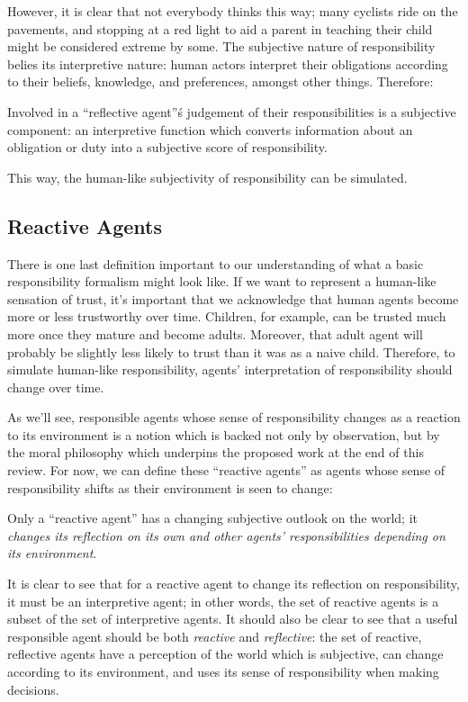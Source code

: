 However, it is clear that not everybody thinks this way; many cyclists ride on the pavements, and stopping at a red light to aid a parent in teaching their child might be considered extreme by some. The subjective nature of responsibility belies its interpretive nature: human actors interpret their obligations according to their beliefs, knowledge, and preferences, amongst other things. Therefore:
\begin{displayquote}
    Involved in a ``reflective agent''\'s judgement of their responsibilities is a subjective component: an interpretive function which converts information about an obligation or duty into a subjective score of responsibility.
\end{displayquote}\par

This way, the human-like subjectivity of responsibility can be simulated.

\subsection{Reactive Agents}
There is one last definition important to our understanding of what a basic responsibility formalism might look like. If we want to represent a human-like sensation of trust, it's important that we acknowledge that human agents become more or less trustworthy over time. Children, for example, can be trusted much more once they mature and become adults. Moreover, that adult agent will probably be slightly less likely to trust than it was as a naive child. Therefore, to simulate human-like responsibility, agents' interpretation of responsibility should change over time.\par

As we'll see, responsible agents whose sense of responsibility changes as a reaction to its environment is a notion which is backed not only by observation, but by the moral philosophy which underpins the proposed work at the end of this review. For now, we can define these ``reactive agents'' as agents whose sense of responsibility shifts as their environment is seen to change:
\begin{displayquote}
    Only a ``reactive agent'' has a changing subjective outlook on the world; it \emph{changes its reflection on its own and other agents' responsibilities depending on its environment}.
\end{displayquote}\par

It is clear to see that for a reactive agent to change its reflection on responsibility, it must be an interpretive agent; in other words, the set of reactive agents is a subset of the set of interpretive agents. It should also be clear to see that a useful responsible agent should be both \emph{reactive} and \emph{reflective}: the set of reactive, reflective agents have a perception of the world which is subjective, can change according to its environment, and uses its sense of responsibility when making decisions.

